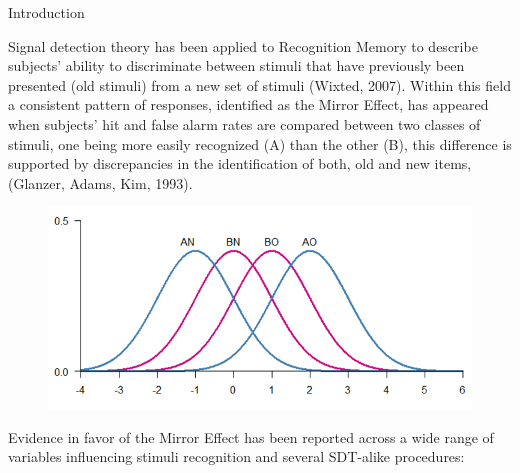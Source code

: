 \documentclass[final]{beamer}
\newlength{\onecolwid}
\begin{document}
\begin{frame}[t]
\begin{columns}[t]
\begin{column}{\onecolwid}



\begin{alertblock}{Introduction}

Signal detection theory has been applied to Recognition Memory to describe subjects’ ability to discriminate between stimuli that have previously been presented (old stimuli) from a new set of stimuli (Wixted, 2007). Within this field a consistent pattern of responses, identified as the Mirror Effect, has appeared when subjects’ hit and false alarm rates are compared between two classes of stimuli, one being more easily recognized (A) than the other (B), this difference is supported by discrepancies in the identification of both, old and new items, (Glanzer, Adams, Kim, 1993). 



\begin{figure}
\includegraphics[width=0.6\linewidth]{Figures/MirrorEffect.png}
\end{figure}




Evidence in favor of the Mirror Effect has been reported across a wide range of variables influencing stimuli recognition and several SDT-alike procedures:




\end{alertblock}
\end{column}
\end{columns}
\end{frame}
\end{document}
